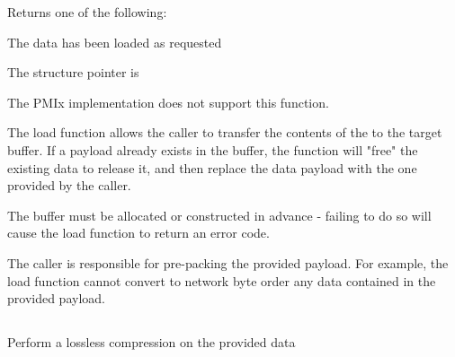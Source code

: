 \begin{arglist}
\end{arglist}

Returns one of the following:
\begin{constantdesc}
\item {} The data has been loaded as requested
\item {} The  structure pointer is 
\item {} The \ac{PMIx} implementation does not support this function.
\end{constantdesc}

\descr

The load function allows the caller to transfer the contents of the 
 to the  target buffer. If a payload
already exists in the buffer, the function will "free" the existing data to
release it, and then replace the data payload with the one provided
by the caller.

\adviceuserstart
The buffer must be allocated or constructed in advance - failing to do so
will cause the load function to return an error code.

The caller is responsible for pre-packing the provided
payload. For example, the load function cannot convert to network byte order
any data contained in the provided payload.
\adviceuserend


\subsection{}

\summary

Perform a lossless compression on the provided data

\format


\begin{arglist}
\end{arglist}

